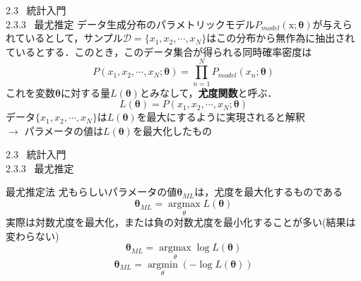 \documentclass[dvipdfmx,8pt]{beamer}
\begin{document}
  \begin{frame}[t]{2.3 \ 統計入門 \\ \normalsize{2.3.3 \ 最尤推定}}
    データ生成分布のパラメトリックモデル$P_{model}(\mathrm{x};\bm{\theta})$が与えられているとして，サンプル$\mathcal{D}=\{x_1,x_2,\cdots,x_N\}$はこの分布から無作為に抽出されているとする．このとき，このデータ集合が得られる同時確率密度は
    \begin{equation*}
      P(x_1,x_2,\cdots,x_N;\bm{\theta}) = \prod_{n=1}^{N}P_{model}(x_n;\bm{\theta})
    \end{equation*}
    これを変数$\bm{\theta}$に対する量$L(\bm{\theta})$とみなして，\textbf{尤度関数}と呼ぶ．
    \begin{equation*}
      L(\bm{\theta}) = P(x_1,x_2,\cdots,x_N;\bm{\theta})
    \end{equation*}
    データ$\{x_1,x_2,\cdots,x_N\}$は$L(\bm{\theta})$を最大にするように実現されると解釈\\
    $\rightarrow$ パラメータの値は$L(\bm{\theta})$を最大化したもの
  \end{frame}

  \begin{frame}[t]{2.3 \ 統計入門 \\ \normalsize{2.3.3 \ 最尤推定}}
    \begin{block}{最尤推定法}
      尤もらしいパラメータの値$\bm{\theta}_{ML}$は，尤度を最大化するものである
      \begin{equation*}
        \bm{\theta}_{ML} = \underset{\theta} {\operatorname{argmax}} L(\bm{\theta})
      \end{equation*}
      実際は対数尤度を最大化，または負の対数尤度を最小化することが多い(結果は変わらない)
      \begin{equation*}
        \bm{\theta}_{ML} = \underset{\theta} {\operatorname{argmax}} \log{L(\bm{\theta})}
      \end{equation*}
      \begin{equation*}
        \bm{\theta}_{ML} = \underset{\theta} {\operatorname{argmin}} (-\log{L(\bm{\theta})})
      \end{equation*}
    \end{block}
  \end{frame}
\end{document}
